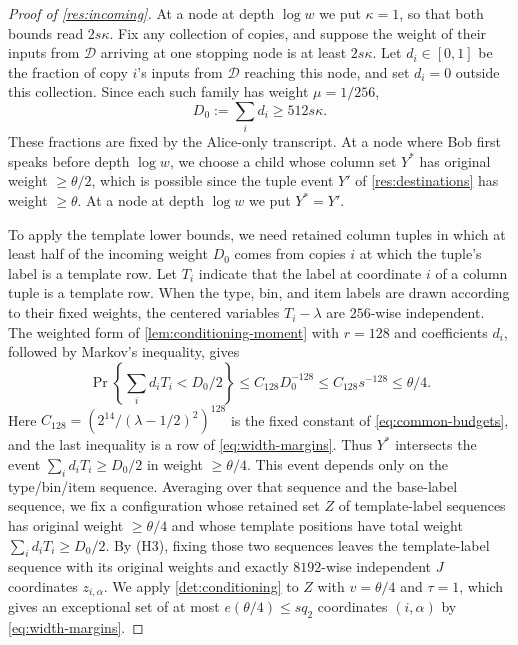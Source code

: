 \documentclass[11pt,letterpaper]{article} \usepackage[utf8]{inputenc}
\theoremstyle{plain} \newtheorem{theorem}{Theorem}[section]
\theoremstyle{definition} \newaliascnt{definition}{theorem}
\begin{document}
\begin{proof}[Proof of \cref{res:incoming}]
\label{proof:res:incoming}
At a node at depth $\log w$ we put $\kappa=1$, so that both bounds read $2s\kappa$. Fix any collection of copies, and suppose
the weight of their inputs from $\mathcal D$ arriving at one stopping node is at least $2s\kappa$.
Let $d_i\in[0,1]$ be the fraction of copy $i$'s inputs from $\mathcal D$ reaching this node,
and set $d_i=0$ outside this collection. Since each such family has weight
$\mu=1/256$,
\[
D_0:=\sum_i d_i\ge512s\kappa.
\]
These fractions are fixed by the Alice-only transcript. At a node where Bob first speaks before depth $\log w$,
we choose a child whose column set $Y^*$ has original weight $\ge\theta/2$,
which is possible since the tuple event $Y'$ of \cref{res:destinations} has weight $\ge\theta$.
At a node at depth $\log w$ we put $Y^*=Y'$.

To apply the template lower bounds, we need retained column tuples in which
at least half of the incoming weight $D_0$ comes from copies $i$ at which the
tuple's label is a template row.
Let $T_i$ indicate that the label at coordinate $i$ of a column tuple is a template row. When the type, bin, and item labels are drawn according to their fixed weights, the centered variables $T_i-\lambda$ are $256$-wise independent.
The weighted form of \cref{lem:conditioning-moment} with $r=128$ and coefficients
$d_i$, followed by Markov's inequality, gives
\[
\Pr\left\{\sum_i d_iT_i<D_0/2\right\}
\le C_{128}D_0^{-128}\le C_{128}s^{-128}\le\theta/4.
\]
Here $C_{128}=(2^{14}/(\lambda-1/2)^2)^{128}$ is the fixed constant
of \eqref{eq:common-budgets}, and the last inequality is a row of \eqref{eq:width-margins}.
Thus $Y^*$ intersects the event $\sum_i d_iT_i\ge D_0/2$ in weight
$\ge\theta/4$.
This event depends only on the type/bin/item sequence. Averaging over that
sequence and the base-label sequence, we fix a
configuration whose retained set $Z$ of template-label sequences has original weight
$\ge\theta/4$ and whose template positions have total weight
$\sum_i d_iT_i\ge D_0/2$.
By (H3), fixing those two sequences leaves the template-label sequence
with its original weights and exactly $8192$-wise independent
$J$ coordinates $z_{i,\alpha}$. We apply
\cref{det:conditioning} to $Z$ with $v=\theta/4$ and $\tau=1$, which gives an exceptional set of at most
$e(\theta/4)\le sq_2$ coordinates $(i,\alpha)$ by \eqref{eq:width-margins}.


\end{proof}
\end{document}
